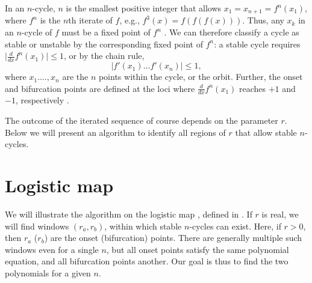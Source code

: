 \documentclass{ws-ijbc}
\begin{document}
In an $n$-cycle, $n$ is the smallest positive integer
  that allows $x_1 = x_{n+1} = f^n(x_1)$,
  where $f^n$ is the $n$th iterate of $f$,
  e.g., $f^3(x) = f(f(f(x)))$.
Thus, any $x_k$ in an $n$-cycle of $f$ must be a fixed point of $f^n$
%
\big[the reverse is, however, untrue, for a fixed point of $f^n$
  can also be a fixed point of $f^d$ as long as $d|n$:
  if $f^d(x) = x$, then $f^n(x) = f^d(\cdots f^d(x)\cdots) = x$\big].
%
%
We can therefore classify a cycle as stable or unstable
  by the corresponding fixed point of $f^n$:
  a stable cycle requires
  $\big| \frac {d} {dx} f^n(x_1) \big| \le 1$,
  or by the chain rule,
%
%
%
\begin{equation}
  \Big| f'(x_1) \dots f'(x_n) \Big| \le 1,
\label{eq:der}
\end{equation}
where $x_1. \ldots, x_n$ are the $n$ points within the cycle, or the orbit.
Further, the onset and bifurcation points
  are defined at the loci
  where $\frac {d} {dx} f^n(x_1)$ reaches $+1$ and $-1$,
  respectively \cite{strogatz}.
%
%
%



The outcome of the iterated sequence of course
  depends on the parameter $r$.
%
Below we will present an algorithm to identify
  all regions of $r$ that allow stable $n$-cycles.
%








\section{\label{sec:logmap}Logistic map}


We will illustrate the algorithm on the logistic map \cite{may, strogatz},
  defined in .
If $r$ is real,
  we will find windows $(r_a, r_b)$,
    within which stable $n$-cycles can exist.
%
Here, if $r > 0$, then
  $r_a$ ($r_b$) are the onset (bifurcation) points.
%
There are generally multiple such windows even for a single $n$,
but all onset points satisfy the same polynomial equation,
  and all bifurcation points another.
%
Our goal is thus to find the two polynomials for a given $n$.
\end{document}
